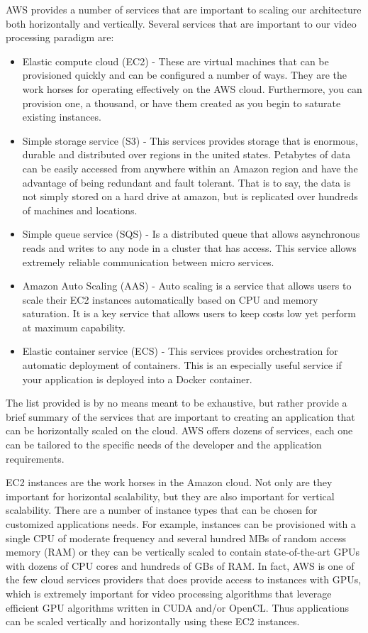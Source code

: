 AWS provides a number of services that are important to scaling our architecture
both horizontally and vertically. Several services that are important to
our video processing paradigm are:
\begin{itemize}
\item Elastic compute cloud (EC2) - These are virtual machines that can be
provisioned quickly and can be configured a number of ways. They are the work
horses for operating effectively on the AWS cloud. Furthermore, you can
provision one, a thousand, or have them created as you begin to saturate
existing instances.
\item Simple storage service (S3) - This services provides storage that is enormous,
durable and distributed over regions in the united states. Petabytes of data can
be easily accessed from anywhere within an Amazon region and have the advantage
of being redundant and fault tolerant. That is to say, the data is not simply
stored on a hard drive at amazon, but is replicated over hundreds of machines
and locations.
\item Simple queue service (SQS) - Is a distributed queue that allows asynchronous
reads and writes to any node in a cluster that has access. This service allows
extremely reliable communication between micro services.
\item Amazon Auto Scaling (AAS) - Auto scaling is a service that allows users
to scale their EC2 instances automatically based on CPU and memory saturation. It
is a key service that allows users to keep costs low yet perform at maximum
capability.
\item Elastic container service (ECS) - This services provides orchestration for
automatic deployment of containers. This is an especially useful service if
your application is deployed into a Docker container.
\end{itemize}

The list provided is by no means meant to be exhaustive, but rather provide
a brief summary of the services that are important to creating an application
that can be horizontally scaled on the cloud. AWS offers dozens of services, each
one can be tailored to the specific needs of the developer and the application
requirements.

EC2 instances are the work horses in the Amazon cloud. Not only are they important
for horizontal scalability, but they are also important for vertical scalability.
There are a number of instance types that can be chosen for customized
applications needs. For example, instances can be provisioned with a single CPU
of moderate frequency and several hundred MBs of random access memory (RAM) or
they can be vertically scaled to contain state-of-the-art GPUs with dozens of
CPU cores and hundreds of GBs of RAM. In fact, AWS is one of the few cloud
services providers that does provide access to instances with GPUs, which is
extremely important for video processing algorithms that leverage efficient
GPU algorithms written in CUDA and/or OpenCL. Thus applications can be scaled
vertically and horizontally using these EC2 instances.

